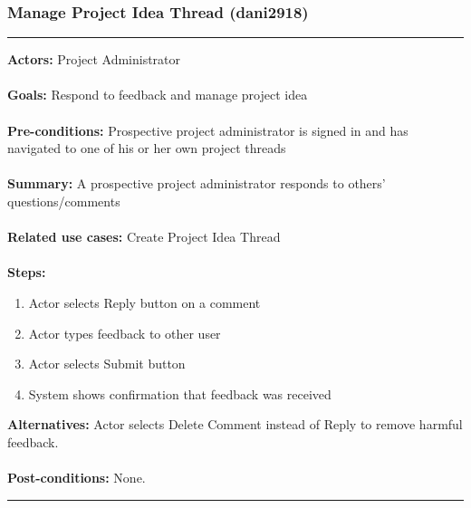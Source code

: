 \documentclass[11pt]{report}
\begin{document}
\subsubsection{Manage Project Idea Thread (dani2918)}
\vspace{2pt}
\hrule
\vspace{8pt}
 \textbf{Actors:} Project Administrator \\ \\
\textbf{Goals:} Respond to feedback and manage project idea  \\ \\
 \textbf{Pre-conditions:} Prospective project administrator is signed in and has navigated to one of his or her own project threads  \\ \\
 \textbf{Summary:}  A prospective project administrator responds to others' questions/comments \\ \\
\textbf{Related use cases:} Create Project Idea Thread \\ \\
\textbf{Steps:} \begin{enumerate}
  \item Actor selects Reply button on a comment
  \item Actor types feedback to other user
  \item Actor selects Submit button 
  \item System shows confirmation that feedback was received 
  
 \end{enumerate}
 \textbf{Alternatives:} Actor selects Delete Comment instead of Reply to remove harmful feedback. \\ \\
 \textbf{Post-conditions:} None. \\
\vspace{8pt}
\hrule
\newpage
\end{document}
